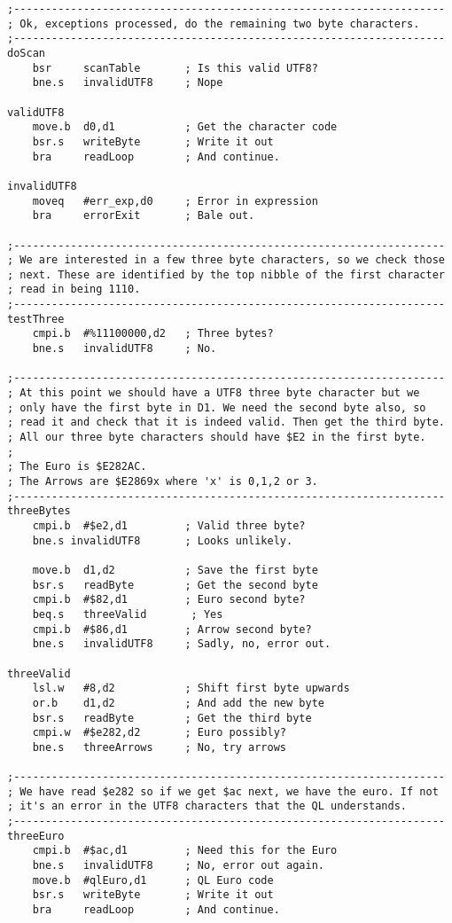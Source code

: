 \begin{lstlisting}[firstnumber=1, caption={Wolfgang's improved utf82ql Utility}]
;--------------------------------------------------------------------
; Ok, exceptions processed, do the remaining two byte characters.
;--------------------------------------------------------------------
doScan
    bsr     scanTable       ; Is this valid UTF8?
    bne.s   invalidUTF8     ; Nope

validUTF8
    move.b  d0,d1           ; Get the character code
    bsr.s   writeByte       ; Write it out
    bra     readLoop        ; And continue.

invalidUTF8
    moveq   #err_exp,d0     ; Error in expression
    bra     errorExit       ; Bale out.

;--------------------------------------------------------------------
; We are interested in a few three byte characters, so we check those
; next. These are identified by the top nibble of the first character
; read in being 1110.
;--------------------------------------------------------------------
testThree
    cmpi.b  #%11100000,d2   ; Three bytes?
    bne.s   invalidUTF8     ; No.

;--------------------------------------------------------------------
; At this point we should have a UTF8 three byte character but we 
; only have the first byte in D1. We need the second byte also, so 
; read it and check that it is indeed valid. Then get the third byte.
; All our three byte characters should have $E2 in the first byte.
;
; The Euro is $E282AC.
; The Arrows are $E2869x where 'x' is 0,1,2 or 3.
;--------------------------------------------------------------------
threeBytes
    cmpi.b  #$e2,d1         ; Valid three byte?
    bne.s invalidUTF8       ; Looks unlikely.

    move.b  d1,d2           ; Save the first byte
    bsr.s   readByte        ; Get the second byte
    cmpi.b  #$82,d1         ; Euro second byte?
    beq.s   threeValid       ; Yes
    cmpi.b  #$86,d1         ; Arrow second byte?
    bne.s   invalidUTF8     ; Sadly, no, error out.

threeValid
    lsl.w   #8,d2           ; Shift first byte upwards
    or.b    d1,d2           ; And add the new byte
    bsr.s   readByte        ; Get the third byte
    cmpi.w  #$e282,d2       ; Euro possibly?
    bne.s   threeArrows     ; No, try arrows
     
;--------------------------------------------------------------------
; We have read $e282 so if we get $ac next, we have the euro. If not
; it's an error in the UTF8 characters that the QL understands.
;--------------------------------------------------------------------
threeEuro
    cmpi.b  #$ac,d1         ; Need this for the Euro
    bne.s   invalidUTF8     ; No, error out again.
    move.b  #qlEuro,d1      ; QL Euro code
    bsr.s   writeByte       ; Write it out
    bra     readLoop        ; And continue.



\end{lstlisting}
